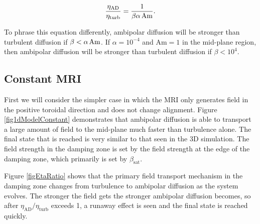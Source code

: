 \begin{equation}
\frac{\eta_{\text{AD}}}{\eta_{\text{turb}}} = \frac{1}{\beta \alpha \hspace{0.5mm} \text{Am}}.
\label{eqEtaRatio}
\end{equation}

\noindent  To phrase this equation differently, ambipolar diffusion will be stronger than turbulent diffusion if $\beta < \alpha \hspace{0.5mm} \text{Am}$.  If $\alpha=10^{-4}$ and $\text{Am}=1$ in the mid-plane region, then ambipolar diffusion will be stronger than turbulent diffusion if $\beta<10^4$.


\subsection{Constant MRI}
First we will consider the simpler case in which the MRI only generates field in the positive toroidal direction and does not change alignment.  Figure \ref{fig1dModelConstant} demonstrates that ambipolar diffusion is able to transport a large amount of field to the mid-plane much faster than turbulence alone.  The final state that is reached is very similar to that seen in the 3D simulation.  The field strength in the damping zone is set by the field strength at the edge of the damping zone, which primarily is set by $\beta_\text{sat}$.  

Figure \ref{figEtaRatio} shows that the primary field transport mechanism in the damping zone changes from turbulence to ambipolar diffusion as the system evolves.  The stronger the field gets the stronger ambipolar diffusion becomes, so after $\eta_\text{AD}/\eta_\text{turb}$ exceeds 1, a runaway effect is seen and the final state is reached quickly.  

